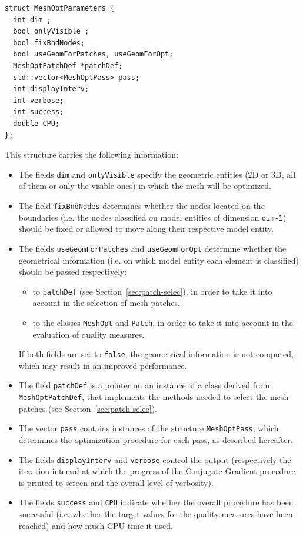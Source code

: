 \documentclass[12pt,a4paper,a4wide]{article}
\begin{document}
\begin{verbatim}
struct MeshOptParameters {
  int dim ;
  bool onlyVisible ;
  bool fixBndNodes;
  bool useGeomForPatches, useGeomForOpt;
  MeshOptPatchDef *patchDef;
  std::vector<MeshOptPass> pass;
  int displayInterv;
  int verbose;
  int success;
  double CPU;
};
\end{verbatim}

This structure carries the following information:
\begin{itemize}
\item The fields \texttt{dim} and \texttt{onlyVisible} specify the
geometric entities (2D or 3D, all of them or only the visible ones)
in which the mesh will be optimized.
\item The field \texttt{fixBndNodes} determines whether the nodes
located on the boundaries (i.e. the nodes classified on model
entities of dimension \texttt{dim-1}) should be fixed or allowed to
move along their respective model entity.
\item The fields \texttt{useGeomForPatches} and \texttt{useGeomForOpt}
determine whether the geometrical information (i.e. on which model
entity each element is classified) should be passed respectively:
\begin{itemize}
\item to \texttt{patchDef} (see Section~\ref{sec:patch-selec}), in
order to take it into account in the selection of mesh patches,
\item to the classes \texttt{MeshOpt} and \texttt{Patch}, in order
to take it into account in the evaluation of quality measures.   
\end{itemize}
If both fields are set to \texttt{false}, the geometrical information
is not computed, which may result in an improved performance.
\item The field \texttt{patchDef} is a pointer on an instance of a
class derived from \texttt{MeshOptPatchDef}, that implements the
methods needed to select the mesh patches (see
Section~\ref{sec:patch-selec}).
\item The vector \texttt{pass} contains instances of the structure
\texttt{MeshOptPass}, which determines the optimization procedure
for each pass, as described hereafter.
\item The fields \texttt{displayInterv} and \texttt{verbose} control
the output (respectively the iteration interval at which the progress
of the Conjugate Gradient procedure is printed to screen and the
overall level of verbosity).
\item The fields \texttt{success} and \texttt{CPU} indicate whether
the overall procedure has been successful (i.e. whether the target
values for the quality measures have been reached) and how much CPU
time it used.
\end{itemize}
\end{document}
